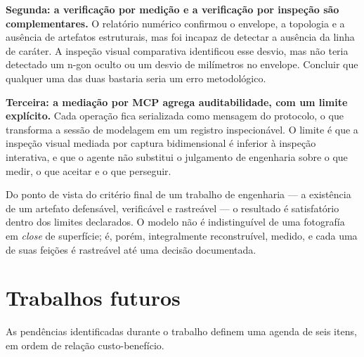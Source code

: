 \textbf{Segunda: a verifica{\c{c}}\~ao por medi{\c{c}}\~ao e a verifica{\c{c}}\~ao por
inspe{\c{c}}\~ao s\~ao complementares.} O relat\'orio num\'erico confirmou o envelope,
a topologia e a aus\^encia de artefatos estruturais, mas foi incapaz de detectar a
aus\^encia da linha de car\'ater. A inspe{\c{c}}\~ao visual comparativa identificou esse
desvio, mas n\~ao teria detectado um n-gon oculto ou um desvio de mil\'imetros no
envelope. Concluir que qualquer uma das duas bastaria seria um erro metodol\'ogico.

\textbf{Terceira: a media{\c{c}}\~ao por MCP agrega auditabilidade, com um limite
expl\'icito.} Cada opera{\c{c}}\~ao fica serializada como mensagem do protocolo, o que
transforma a sess\~ao de modelagem em um registro inspecion\'avel. O limite \'e que a
inspe{\c{c}}\~ao visual mediada por captura bidimensional \'e inferior \`a inspe{\c{c}}\~ao
interativa, e que o agente n\~ao substitui o julgamento de engenharia sobre o que medir, o
que aceitar e o que perseguir.

Do ponto de vista do crit\'erio final de um trabalho de engenharia ---
a exist\^encia de um artefato defens\'avel, verific\'avel e rastre\'avel --- o resultado
\'e satisfat\'orio dentro dos limites declarados. O modelo n\~ao \'e indistingu\'ivel de
uma fotograf\'ia em \emph{close} de superf\'icie; \'e, por\'em, integralmente
reconstru\'ivel, medido, e cada uma de suas fei{\c{c}}\~oes \'e rastre\'avel at\'e uma
decis\~ao documentada.

\section{Trabalhos futuros}

As pend\^encias identificadas durante o trabalho definem uma agenda de seis itens, em ordem
de rela{\c{c}}\~ao custo-benef\'icio.

